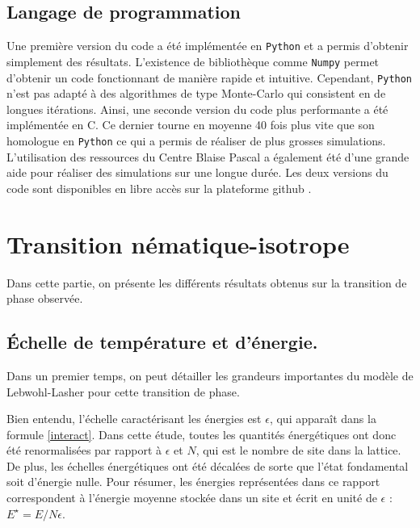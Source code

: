 \documentclass[11pt,a4paper]{article}
\numberwithin{equation}{section}
\newcommand{\CC}{C\nolinebreak\hspace{-.05em}\raisebox{.4ex}{\tiny\bf +}\nolinebreak\hspace{-.10em}\raisebox{.4ex}{\tiny\bf +}}
\def\CC{{C\nolinebreak[4]\hspace{-.05em}\raisebox{.4ex}{\tiny\bf ++}}}
\begin{document}
\subsection{Langage de programmation}
Une première version du code a été implémentée en \texttt{Python} et a permis d'obtenir simplement des résultats. L'existence de bibliothèque comme \texttt{Numpy} permet d'obtenir un code fonctionnant de manière rapide et intuitive. Cependant, \texttt{Python} n'est pas adapté à des algorithmes de type Monte-Carlo qui consistent en de longues itérations. Ainsi, une seconde version du code plus performante a été implémentée en \CC. Ce dernier tourne en moyenne 40 fois plus vite que son homologue en \texttt{Python} ce qui a permis de réaliser de plus grosses simulations. L'utilisation des ressources du Centre Blaise Pascal a également été d'une grande aide pour réaliser des simulations sur une longue durée. Les deux versions du code sont disponibles en libre accès sur la plateforme github \cite{github}.
\newpage
\section{Transition nématique-isotrope}
Dans cette partie, on présente les différents résultats obtenus sur la transition de phase observée. 
\subsection{Échelle de température et d'énergie.}
\label{scale}
Dans un premier temps, on peut détailler les grandeurs importantes du modèle de Lebwohl-Lasher pour cette transition de phase.
\medskip

Bien entendu, l'échelle caractérisant les énergies est $\epsilon$, qui apparaît dans la formule \ref{interact}. Dans cette étude, toutes les quantités énergétiques ont donc été renormalisées par rapport à $\epsilon$ et $N$, qui est le nombre de site dans la lattice. De plus, les échelles énergétiques ont été décalées de sorte que l'état fondamental soit d'énergie nulle. Pour résumer, les énergies représentées dans ce rapport correspondent à l'énergie moyenne stockée dans un site et écrit en unité de $\epsilon$ : $E^\star=E/N\epsilon$.
\medskip
\end{document}

